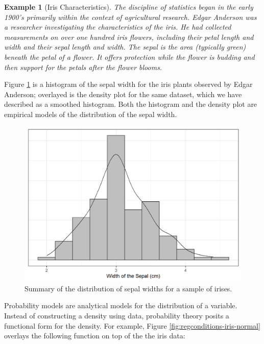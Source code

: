 \documentclass[
]{book}
\theoremstyle{plain}
\theoremstyle{mydefn}
\theoremstyle{myexmpl}
\newtheorem{example}{Example}[chapter]
\theoremstyle{remark}
\begin{document}
\begin{example}[Iris Characteristics]
\protect\hypertarget{exm:ex-iris}{}{\label{exm:ex-iris} {} }The discipline of statistics began in the early 1900's primarily within the context of agricultural research. Edgar Anderson was a researcher investigating the characteristics of the iris. He had collected measurements on over one hundred iris flowers, including their petal length and width and their sepal length and width. The sepal is the area (typically green) beneath the petal of a flower. It offers protection while the flower is budding and then support for the petals after the flower blooms.
\end{example}

Figure \ref{fig:regconditions-iris-histogram} is a histogram of the sepal width for the iris plants observed by Edgar Anderson; overlayed is the density plot for the same dataset, which we have described as a smoothed histogram. Both the histogram and the density plot are empirical models of the distribution of the sepal width.

\begin{figure}

{\centering \includegraphics[width=0.8\linewidth]{./Images/regconditions-iris-histogram-1} 

}

\caption{Summary of the distribution of sepal widths for a sample of irises.}\label{fig:regconditions-iris-histogram}
\end{figure}

Probability models are analytical models for the distribution of a variable. Instead of constructing a density using data, probability theory posits a functional form for the density. For example, Figure \ref{fig:regconditions-iris-normal} overlays the following function on top of the the iris data:
\end{document}
